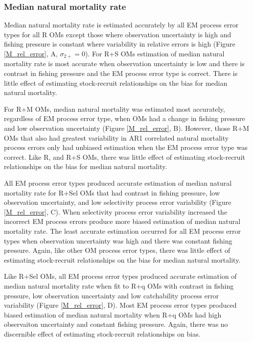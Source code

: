 \documentclass[
  12pt,
]{article}
\begin{document}
\hypertarget{median-natural-mortality-rate}{%
\subsubsection*{Median natural mortality
rate}\label{median-natural-mortality-rate}}

Median natural mortality rate is estimated accurately by all EM process
error types for all R OMs except those where observation uncertainty is
high and fishing pressure is constant where variability in relative
errors is high (Figure \ref{M_rel_error}, A, \(\sigma_{2+} = 0\)). For
R+S OMs estimation of median natural mortality rate is most accurate
when observation uncertainty is low and there is contrast in fishing
pressure and the EM process error type is correct. There is little
effect of estimating stock-recruit relationships on the bias for median
natural mortality.

For R+M OMs, median natural mortality was estimated most accurately,
regardless of EM process error type, when OMs had a change in fishing
pressure and low observation uncertainty (Figure \ref{M_rel_error}, B).
However, those R+M OMs that also had greatest variability in AR1
correlated natural mortality process errors only had unbiased estimation
when the EM process error type was correct. Like R, and R+S OMs, there
was little effect of estimating stock-recruit relationships on the bias
for median natural mortality.

All EM process error types produced accurate estimation of median
natural mortality rate for R+Sel OMs that had contrast in fishing
pressure, low observation uncertainty, and low selectivity process error
variability (Figure \ref{M_rel_error}, C). When selectivity process
error variability increased the incorrect EM process errors produce more
biased estimation of median natural mortality rate. The least accurate
estimation occurred for all EM process error types when observation
uncertainty was high and there was constant fishing pressure. Again,
like other OM process error types, there was little effect of estimating
stock-recruit relationships on the bias for median natural mortality.

Like R+Sel OMs, all EM process error types produced accurate estimation
of median natural mortality rate when fit to R+q OMs with contrast in
fishing pressure, low observation uncertainty and low catchability
process error variability (Figure \ref{M_rel_error}, D). Most EM process
error types produced biased estimation of median natural mortality when
R+q OMs had high observaiton uncertainty and constant fishing pressure.
Again, there was no discernible effect of estimating stock-recruit
relationships on bias.
\end{document}
